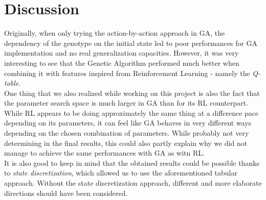 \section{Discussion}
Originally, when only trying the action-by-action approach in GA, the dependency of the genotype on the initial state led to poor performances for GA implementation and no real generalization capacities.
However, it was very interesting to see that the Genetic Algorithm performed much better when combining it with features inspired from Reinforcement Learning - namely the \textit{Q-table}.
\\
One thing that we also realized while working on this project is also the fact that the parameter search space is much larger in GA than for its RL counterpart. 
While RL appears to be doing approximately the same thing at a difference pace depending on its parameters, it can feel like GA behaves in very different ways depending on the chosen combination of parameters.
While probably not very determining in the final results, this could also partly explain why we did not manage to achieve the same performances with GA as witn RL.
\\
It is also good to keep in mind that the obtained results could be possible thanks to \textit{state discretization}, which allowed us to use the aforementioned tabular approach.
Without the state discretization approach, different and more elaborate directions should have been considered. 


